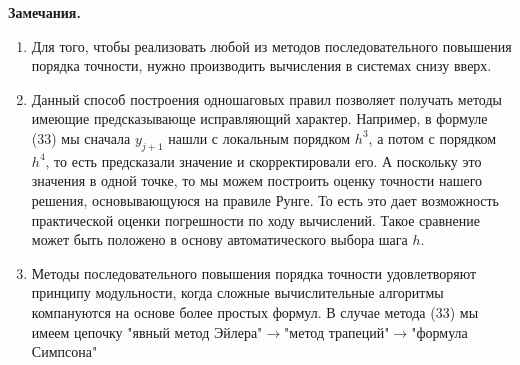 \documentclass[a4paper, 12pt]{report}
\begin{document}
	\textbf{Замечания.}
	\begin{enumerate}
		\item Для того, чтобы реализовать любой из методов последовательного повышения порядка точности, нужно производить вычисления в системах снизу вверх.
		\item Данный способ построения одношаговых правил позволяет получать методы имеющие предсказывающе исправляющий характер. Например, в формуле (33) мы сначала $y_{j+1}$ нашли с локальным порядком $h^3$, а потом с порядком $h^4$, то есть предсказали значение и скорректировали его. А поскольку это значения в одной точке, то мы можем построить оценку точности нашего решения, основывающуюся на правиле Рунге. То есть это дает возможность практической оценки погрешности по ходу вычислений. Такое сравнение может быть положено в основу автоматического выбора шага $h$.
		\item Методы последовательного повышения порядка точности удовлетворяют принципу модульности, когда сложные вычислительные алгоритмы компануются на основе более простых формул. В случае метода (33) мы имеем цепочку "явный метод Эйлера"$\to$"метод трапеций"$\to$"формула Симпсона"
	\end{enumerate}
\end{document}
